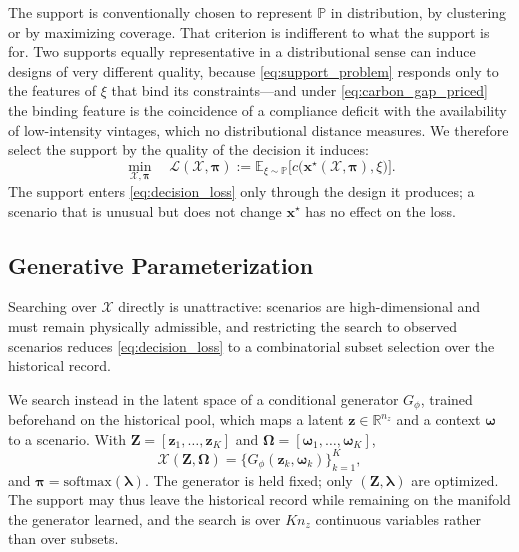 The support is conventionally chosen to represent $\mathbb{P}$ in
distribution, by clustering or by maximizing coverage. That criterion is
indifferent to what the support is for. Two supports equally
representative in a distributional sense can induce designs of very
different quality, because \eqref{eq:support_problem} responds only to
the features of $\xi$ that bind its constraints---and under
\eqref{eq:carbon_gap_priced} the binding feature is the coincidence of a
compliance deficit with the availability of low-intensity vintages, which
no distributional distance measures. We therefore select the support by
the quality of the decision it induces:
\begin{equation}
\min_{\mathcal{X},\boldsymbol{\pi}}
\quad
\mathcal{L}(\mathcal{X},\boldsymbol{\pi})
:=
\mathbb{E}_{\xi\sim\mathbb{P}}
\bigl[
c\bigl(\boldsymbol{x}^{\star}(\mathcal{X},\boldsymbol{\pi}),\xi\bigr)
\bigr].
\label{eq:decision_loss}
\end{equation}
The support enters \eqref{eq:decision_loss} only through the design it
produces; a scenario that is unusual but does not change
$\boldsymbol{x}^{\star}$ has no effect on the loss.

\subsection{Generative Parameterization}
\label{sec:parameterization}

Searching over $\mathcal{X}$ directly is unattractive: scenarios are
high-dimensional and must remain physically admissible, and restricting
the search to observed scenarios reduces \eqref{eq:decision_loss} to a
combinatorial subset selection over the historical record.

We search instead in the latent space of a conditional generator
$G_{\phi}$, trained beforehand on the historical pool, which maps a
latent $\boldsymbol{z}\in\mathbb{R}^{n_z}$ and a context
$\boldsymbol{\omega}$ to a scenario. With
$\boldsymbol{Z}=[\boldsymbol{z}_1,\dots,\boldsymbol{z}_K]$ and
$\boldsymbol{\Omega}=[\boldsymbol{\omega}_1,\dots,\boldsymbol{\omega}_K]$,
\begin{equation}
\mathcal{X}(\boldsymbol{Z},\boldsymbol{\Omega})
=
\bigl\{
G_{\phi}(\boldsymbol{z}_k,\boldsymbol{\omega}_k)
\bigr\}_{k=1}^{K},
\label{eq:generated_support}
\end{equation}
and $\boldsymbol{\pi}=\mathrm{softmax}(\boldsymbol{\lambda})$. The
generator is held fixed; only $(\boldsymbol{Z},\boldsymbol{\lambda})$ are
optimized. The support may thus leave the historical record while
remaining on the manifold the generator learned, and the search is over
$Kn_z$ continuous variables rather than over subsets.

